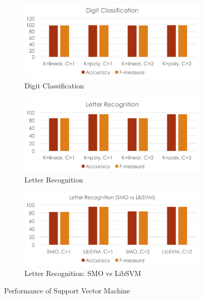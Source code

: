 \documentclass[11pt]{article}
\begin{document}
\begin{figure}[htbp]
\centering
\begin{subfigure}[htbp]{0.46\columnwidth}
\includegraphics*[width=\textwidth]{fig/digit_svm}
\caption{Digit Classification}
\label{fig:digit-svm}
\end{subfigure}
\hfill
\begin{subfigure}[htbp]{0.46\columnwidth}
\includegraphics*[width=\textwidth]{fig/letter_svm}
\caption{Letter Recognition}
\label{fig:letter-svm}
\end{subfigure}
\hfill
\begin{subfigure}[htbp]{0.46\columnwidth}
\includegraphics*[width=\textwidth]{fig/smo_libsvm}
\caption{Letter Recognition: SMO vs LibSVM}
\label{fig:smo-libsvm}
\end{subfigure}
\caption{Performance of Support Vector Machine}
\label{fig:svm}
\end{figure}
\end{document}
